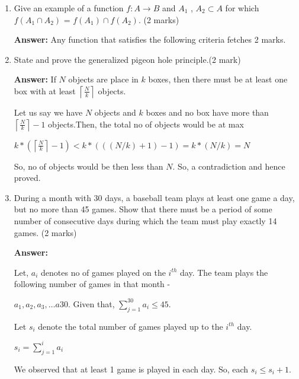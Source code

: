 \documentclass[a4paper]{article}
\begin{document}
\begin{enumerate}
\item Give  an  example  of a function  $f : A \rightarrow B$  and  $A_1$ , $A_2 \subset A$ for which
$f(A_1 \cap A_2)$ = $f(A_1) \cap f(A_2)$.  (2 marks)

\textbf{Answer:}
Any function that satisfies the following criteria fetches 2 marks.

\item State  and prove the generalized  pigeon hole principle.(2 mark)

\textbf{Answer:}
If $N$ objects are place in $k$ boxes, then there must be at least one box with at least
\begin{math}
\left \lceil{\frac{N}{k}}\right \rceil 
\end{math}
objects.

Let us say we have $N$ objects and $k$ boxes and no box have more than
\begin{math}
\left \lceil{\frac{N}{k}}\right \rceil -1 
\end{math}
objects.Then, the total no of objects would be at max

\begin{math}
k*( \left \lceil{\frac{N}{k}}\right \rceil -1 ) < k*(((N/k)+1)-1)=k*(N/k)=N
\end{math}

So, no of objects would be then less than $N$. So, a contradiction and hence proved. 

\item During  a month  with 30 days,  a baseball  team  plays at  least  one game a day,  but  no more  than  45 games.   Show that there  must  be a period  of some number  of consecutive days during which the team must play exactly
14 games.  (2 marks)

\textbf{Answer:}

Let, $a_i$ denotes no of games played on the $i^{th}$ day. The team plays the following number of games in that month - 

$a_1, a_2, a_3, \dots a30$.
Given that, 
\begin{math}
\sum_{j=1}^{30} a_i  \leq 45.
\end{math}

Let $s_i$ denote the total number of games played up to the $i^{th}$ day.

\begin{math}
s_i=\sum_{j=1}^{i} a_i 
\end{math}

We observed that at least 1 game is played in each day. So, each $s_i \leq s_i+1$. 


\end{enumerate}
\end{document}
